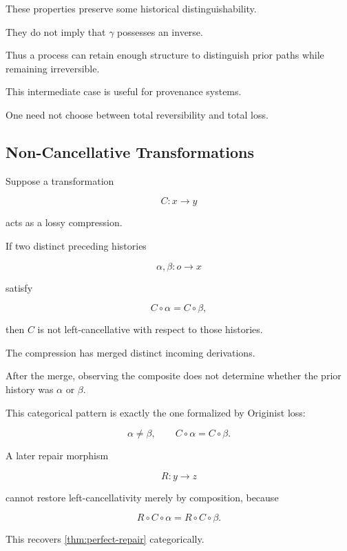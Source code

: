 \documentclass[
  11pt,
  a4paper,
  DIV=12,
  BCOR=0mm,
  parskip=half-
]{scrartcl}
\theoremstyle{definition}
\theoremstyle{plain}
\theoremstyle{remark}
\begin{document}
These properties preserve some historical distinguishability.

They do not imply that \(\gamma\) possesses an inverse.

Thus a process can retain enough structure to distinguish prior paths while
remaining irreversible.

This intermediate case is useful for provenance systems.

One need not choose between total reversibility and total loss.


\subsection{Non-Cancellative Transformations}
\label{app:noncancellative}

Suppose a transformation

\[
  C:x\to y
\]

acts as a lossy compression.

If two distinct preceding histories

\[
  \alpha,\beta:o\to x
\]

satisfy

\[
  C\circ\alpha
  =
  C\circ\beta,
\]

then \(C\) is not left-cancellative with respect to those histories.

The compression has merged distinct incoming derivations.

After the merge, observing the composite does not determine whether the prior
history was \(\alpha\) or \(\beta\).

This categorical pattern is exactly the one formalized by Originist loss:

\[
  \alpha\neq\beta,
  \qquad
  C\circ\alpha=C\circ\beta.
\]

A later repair morphism

\[
  R:y\to z
\]

cannot restore left-cancellativity merely by composition, because

\[
  R\circ C\circ\alpha
  =
  R\circ C\circ\beta.
\]

This recovers \cref{thm:perfect-repair} categorically.

\end{document}
